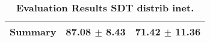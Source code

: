 \begin{table}[htb]
{\begin{tabular}{lll}
\midrule
\textbf{Summary                                  } &        \phantom{0}87.08 $\pm$ \phantom{0}8.43 &                      \phantom{0}71.42 $\pm$ 11.36 \\
\bottomrule
\end{tabular}%
}
\caption{\textbf{Evaluation Results SDT distrib inet.}}
\label{tab:eval-results}
\end{table}

